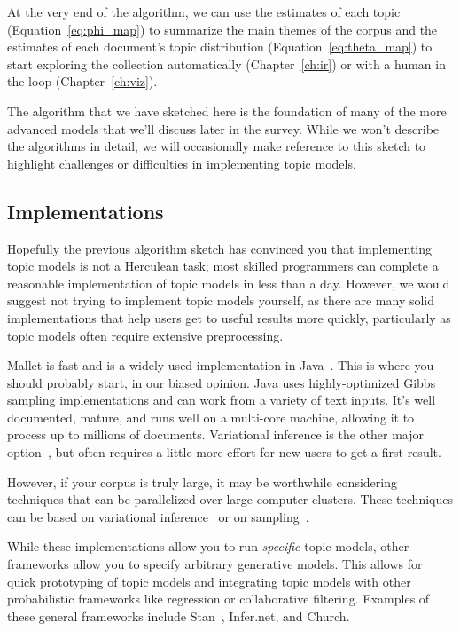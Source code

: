 At the very end of the algorithm, we can use the estimates of each topic
(Equation~\ref{eq:phi_map}) to summarize the main themes of the corpus and the
estimates of each document's topic distribution (Equation~\ref{eq:theta_map}) to
start exploring the collection automatically (Chapter~\ref{ch:ir}) or with a
human in the loop (Chapter~\ref{ch:viz}).

The algorithm that we have sketched here is the foundation of many of the more
advanced models that we'll discuss later in the survey.  While we won't describe
the algorithms in detail, we will occasionally make reference to this sketch to
highlight challenges or difficulties in implementing topic models.

\subsection{Implementations}

Hopefully the previous algorithm sketch has convinced you that implementing
topic models is not a Herculean task; most skilled programmers can complete a
reasonable implementation of topic models in less than a day.  However, we would
suggest not trying to implement topic models yourself, as there are many solid
implementations that help users get to useful results more quickly, particularly
as topic models often require extensive preprocessing.

Mallet is fast and is a widely used implementation in Java~\citep{mallet}.  This
is where you should probably start, in our biased opinion.  Java uses
highly-optimized Gibbs sampling implementations and can work from a variety of
text inputs.  It's well documented, mature, and runs well on a multi-core
machine, allowing it to process up to millions of documents.  Variational
inference is the other major option~\citep{blei-03,vw}, but often requires a
little more effort for new users to get a first result.

However, if your corpus is truly large, it may be worthwhile considering
techniques that can be parallelized over large computer clusters.  These
techniques can be based on variational
inference~\citep{Narayanamurthy-11,zhai-12} or on sampling~\citep{}.

While these implementations allow you to run \emph{specific} topic models, other
frameworks allow you to specify arbitrary generative
models.  This allows for quick prototyping of topic models and integrating topic
models with other probabilistic frameworks like regression or collaborative
filtering.  Examples of these general frameworks include
Stan~\citep{stan-software:2014}, Infer.net, and Church.

